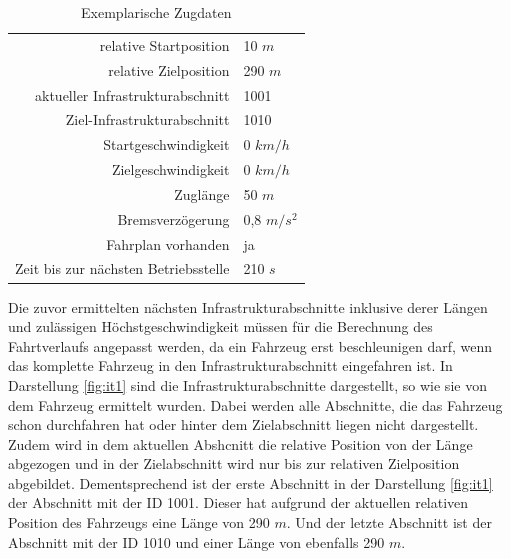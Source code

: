 \begin{table}[]
\begin{center}
\renewcommand{\arraystretch}{1.2}
\begin{tabular}{r L{3cm}}

relative Startposition                   &   10 $m$                         \\ 
relative Zielposition                  &    290 $m$                         \\ 
aktueller Infrastrukturabschnitt                   &   1001                         \\ 
Ziel-Infrastrukturabschnitt                  &    1010                         \\ 
Startgeschwindigkeit                   &   0 $km/h$                          \\ 
Zielgeschwindigkeit                   &    0 $km/h$                        \\ 
Zuglänge                   &    50 $m$                        \\ 
Bremsverzögerung                   &    0,8 $m/s^{2}$                        \\ 
Fahrplan vorhanden                   &    ja                        \\ 
Zeit bis zur nächsten Betriebsstelle                   &    210 $s$                        \\ 

\end{tabular}
\renewcommand{\arraystretch}{1}
\caption{Exemplarische Zugdaten}
\label{table:train-ex}
\end{center}
\end{table}

Die zuvor ermittelten nächsten Infrastrukturabschnitte inklusive derer Längen und zulässigen Höchstgeschwindigkeit müssen für die Berechnung des Fahrtverlaufs angepasst werden, da ein Fahrzeug erst beschleunigen darf, wenn das komplette Fahrzeug in den Infrastrukturabschnitt eingefahren ist. In Darstellung \ref{fig:it1} sind die Infrastrukturabschnitte dargestellt, so wie sie von dem Fahrzeug ermittelt wurden. Dabei werden alle Abschnitte, die das Fahrzeug schon durchfahren hat oder hinter dem Zielabschnitt liegen nicht dargestellt. Zudem wird in dem aktuellen Abshcnitt die relative Position von der Länge abgezogen und in der Zielabschnitt wird nur bis zur relativen Zielposition abgebildet. Dementsprechend ist der erste Abschnitt in der Darstellung \ref{fig:it1} der Abschnitt mit der ID 1001. Dieser hat aufgrund der aktuellen relativen Position des Fahrzeugs eine Länge von 290 $m$. Und der letzte Abschnitt ist der Abschnitt mit der ID 1010 und einer Länge von ebenfalls 290 $m$.

